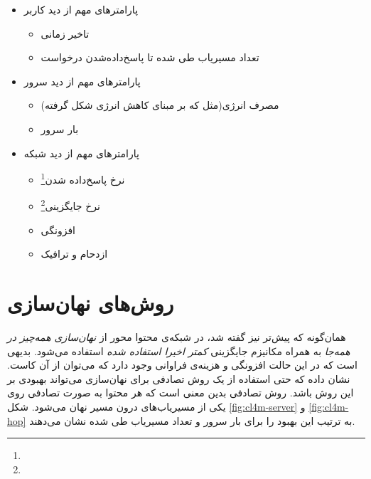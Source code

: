 \begin{itemize}
	\item پارامترهای مهم از دید کاربر
	\begin{itemize}
		\item تاخیر زمانی
		\item تعداد مسیریاب طی شده تا پاسخ‌داده‌شدن درخواست
	\end{itemize}
	
	\item پارامترهای مهم از دید سرور
	\begin{itemize}
		\item مصرف انرژی(مثل \cite{cache_energy} که بر مبنای کاهش انرژی شکل گرفته)
		\item بار سرور
	\end{itemize}
	
	\item پارامترهای مهم از دید شبکه
	\begin{itemize}
		\item نرخ پاسخ‌داده شدن\footnote{}
		\item نرخ جایگزینی\footnote{}
		\item افزونگی
		\item ازدحام و ترافیک
	\end{itemize}
\end{itemize}




\section{روش‌های نهان‌سازی}

همان‌گونه که پیش‌تر نیز گفته شد، در شبکه‌ی محتوا محور از \textit{نهان‌سازی همه‌چیز در همه‌جا }به همراه مکانیزم جایگزینی \textit{کمتر اخیرا استفاده شده} استفاده می‌شود. بدیهی‌ است که در این حالت افزونگی و هزینه‌ی فراوانی وجود دارد که می‌توان از آن کاست. \cite{cl4m} نشان داده که حتی استفاده از یک روش تصادفی برای نهان‌سازی می‌تواند بهبودی بر این روش باشد. روش تصادفی بدین معنی‌ است که هر محتوا به صورت تصادفی روی یکی از مسیریاب‌های درون مسیر نهان می‌شود. شکل \ref{fig:cl4m-server} و \ref{fig:cl4m-hop} به ترتیب این بهبود را برای بار سرور و تعداد مسیریاب طی شده نشان می‌دهند.

